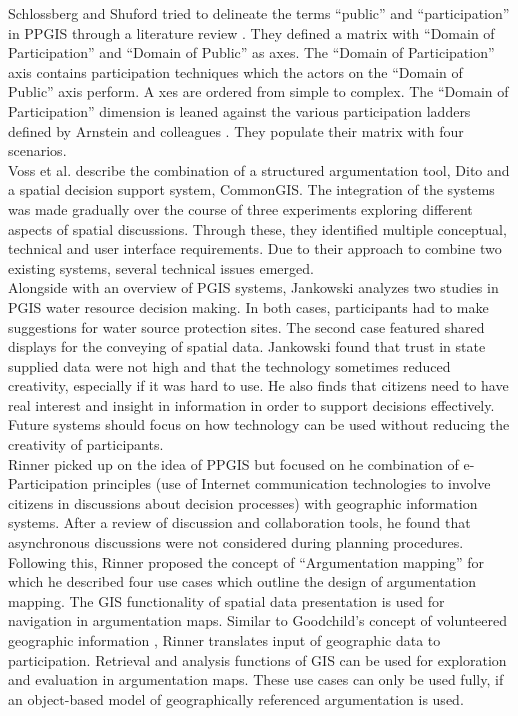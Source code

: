 Schlossberg and Shuford tried to delineate the terms ``public'' and ``participation'' in PPGIS through a literature review \cite{Schlossberg2005_PPGIS}. They defined a matrix with ``Domain of Participation'' and ``Domain of Public'' as axes. The ``Domain of Participation'' axis contains participation techniques which the actors on the ``Domain of Public'' axis perform. A
xes are ordered from simple to complex. The ``Domain of Participation'' dimension is leaned against the various participation ladders defined by Arnstein and colleagues \cite{Arnstein1969_citizen_participation,Wiedemann1993355,Connor1988_new_ladder}. They populate their matrix with four scenarios.\\
Voss et al. \cite{Voss2004_Evolution_PGIS} describe the combination of a structured argumentation tool, Dito and a spatial decision support system, CommonGIS. The integration of the systems was made gradually over the course of three experiments exploring different aspects of spatial discussions. Through these, they identified multiple conceptual, technical and user interface requirements. Due to their approach to combine two existing systems, several technical issues emerged.\\
Alongside with an overview of PGIS systems, Jankowski \cite{Jankowski2005_community_based_pgis} analyzes two studies in PGIS water resource decision making. In both cases, participants had to make suggestions for water source protection sites. The second case featured shared displays for the conveying of spatial data. Jankowski found that trust in state supplied data were not high and that the technology sometimes reduced creativity, especially if it was hard to use. He also finds that citizens need to have real interest and insight in information in order to support decisions effectively. Future systems should focus on how technology can be used without reducing the creativity of participants.\\
Rinner \cite{Rinner_ArgumentationMaps} picked up on the idea of PPGIS but focused on he combination of e-Participation principles (use of Internet communication technologies to involve citizens in discussions about decision processes) with geographic information systems. After a review of discussion and collaboration tools, he found that asynchronous discussions were not considered during planning procedures. Following this, Rinner proposed the concept of ``Argumentation mapping'' for which he described four use cases which outline the design of argumentation mapping. The GIS functionality of spatial data presentation is used for navigation in argumentation maps. Similar to Goodchild's concept of volunteered geographic information \cite{goodchild2007citizens}, Rinner translates input of geographic data to participation. Retrieval and analysis functions of GIS can be used for exploration and evaluation in argumentation maps. These use cases can only be used fully, if an object-based model of geographically referenced argumentation is used.\\
